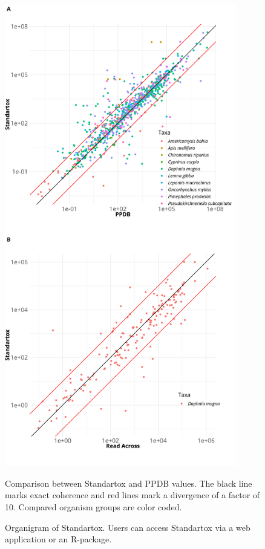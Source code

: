 \documentclass[10pt, a4paper, english]{article}
\begin{document}
\begin{figure}
    \centering
    \begin{minipage}{0.45\textwidth}
        \centering
        \includegraphics[width=0.9\textwidth]{article/figures/gg_ppdb_stan_compare_continous.png}
        \caption{Comparison between Standartox and PPDB values. The black line marks exact coherence and red lines mark a divergence of a factor of 10. Compared organism groups are color coded.}
    \end{minipage}\hfill
    \begin{minipage}{0.45\textwidth}
        \centering
        \caption{Organigram of Standartox. Users can access Standartox via a web application or an R-package.}
    \end{minipage}
\end{figure}



\end{document}
